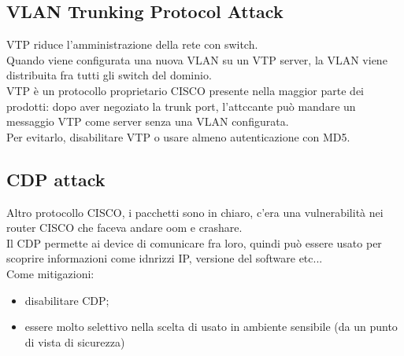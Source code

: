 \documentclass[12pt, oneside]{extbook} %
\begin{document}
\subsection{VLAN Trunking Protocol Attack}
VTP riduce l'amministrazione della rete con switch.
\\Quando viene configurata una nuova VLAN su un VTP server, la VLAN viene distribuita fra tutti gli switch del dominio.
\\VTP è un protocollo proprietario CISCO presente nella maggior parte dei prodotti: dopo aver negoziato la trunk port, l'attccante può mandare un messaggio VTP come server senza una VLAN configurata.
\\Per evitarlo, disabilitare VTP o usare almeno autenticazione con MD5.

\subsection{CDP attack}
Altro protocollo CISCO, i pacchetti sono in chiaro, c'era una vulnerabilità nei router CISCO che faceva andare oom e crashare.
\\Il CDP permette ai device di comunicare fra loro, quindi può essere usato per scoprire informazioni come idnrizzi IP, versione del software etc...
\\Come mitigazioni:
\begin{itemize}
    \item disabilitare CDP;
    \item essere molto selettivo nella scelta di usato in ambiente sensibile (da un punto di vista di sicurezza) 
\end{itemize}
\end{document}
